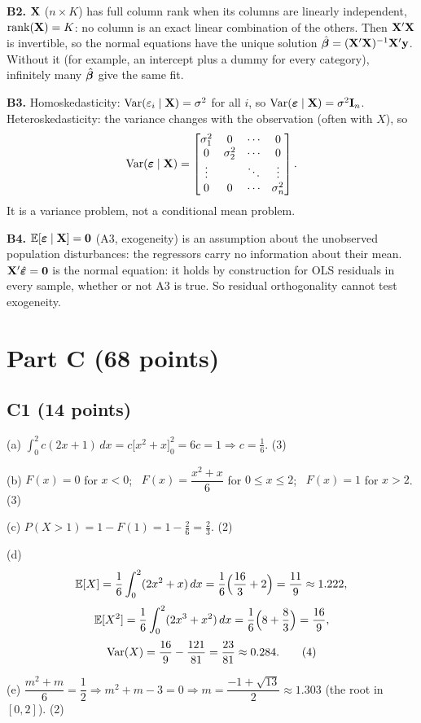 \documentclass[11pt]{article}
\begin{document}
\textbf{B2.} $\mathbf{X}$ ($n\times K$) has full column rank when its columns are linearly independent, $\operatorname{rank}(\mathbf{X})=K$: no column is an exact linear combination of the others. Then $\mathbf{X}'\mathbf{X}$ is invertible, so the normal equations have the unique solution $\hat{\bm{\beta}}=(\mathbf{X}'\mathbf{X})^{-1}\mathbf{X}'\mathbf{y}$. Without it (for example, an intercept plus a dummy for every category), infinitely many $\hat{\bm{\beta}}$ give the same fit.

\textbf{B3.} Homoskedasticity: $\operatorname{Var}(\varepsilon_i\mid\mathbf{X})=\sigma^2$ for all $i$, so $\operatorname{Var}(\bm{\varepsilon}\mid\mathbf{X})=\sigma^2\mathbf{I}_n$. Heteroskedasticity: the variance changes with the observation (often with $X$), so
\[ \operatorname{Var}(\bm{\varepsilon}\mid\mathbf{X})=\begin{bmatrix}\sigma_1^2&0&\cdots&0\\0&\sigma_2^2&\cdots&0\\\vdots&&\ddots&\vdots\\0&0&\cdots&\sigma_n^2\end{bmatrix}. \]
It is a variance problem, not a conditional mean problem.

\textbf{B4.} $\mathbb{E}[\bm{\varepsilon}\mid\mathbf{X}]=\mathbf0$ (A3, exogeneity) is an assumption about the unobserved population disturbances: the regressors carry no information about their mean. $\mathbf{X}'\hat{\bm{\varepsilon}}=\mathbf0$ is the normal equation: it holds by construction for OLS residuals in every sample, whether or not A3 is true. So residual orthogonality cannot test exogeneity.

\section{Part C (68 points)}

\subsection{C1 (14 points)}
(a) $\displaystyle\int_0^2c(2x+1)\,dx=c\big[x^2+x\big]_0^2=6c=1\Rightarrow c=\tfrac16$. \hfill (3)

(b) $F(x)=0$ for $x<0$; \ $F(x)=\dfrac{x^2+x}{6}$ for $0\le x\le2$; \ $F(x)=1$ for $x>2$. \hfill (3)

(c) $P(X>1)=1-F(1)=1-\tfrac26=\tfrac23$. \hfill (2)

(d)
\[ \mathbb{E}[X]=\frac16\int_0^2(2x^2+x)\,dx=\frac16\Big(\frac{16}{3}+2\Big)=\frac{11}{9}\approx1.222, \]\[ \mathbb{E}[X^2]=\frac16\int_0^2(2x^3+x^2)\,dx=\frac16\Big(8+\frac83\Big)=\frac{16}{9}, \]
\[ \operatorname{Var}(X)=\frac{16}{9}-\frac{121}{81}=\frac{23}{81}\approx0.284. \tag*{(4)} \]

(e) $\dfrac{m^2+m}{6}=\dfrac12\Rightarrow m^2+m-3=0\Rightarrow m=\dfrac{-1+\sqrt{13}}{2}\approx1.303$ (the root in $[0,2]$). \hfill (2)
\end{document}
